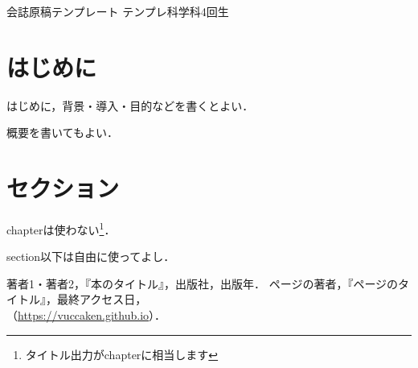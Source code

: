 \documentclass[uplatex,dvipdfmx]{vkaishi}
\begin{document}


\kaishititle%
  {会誌原稿テンプレート}%
  {テンプレ科学科4回生}%
  {}%


\section*{はじめに}
はじめに，背景・導入・目的などを書くとよい．\par
概要を書いてもよい．


\section{セクション}
chapterは使わない\footnote{タイトル出力がchapterに相当します}．\par
section以下は自由に使ってよし．


\begin{thebibliography}{99}
   著者1・著者2，『本のタイトル』，出版社，出版年．
   ページの著者，『ページのタイトル』，最終アクセス日，\\（\url{https://vuccaken.github.io}）．
\end{thebibliography}
\end{document}
